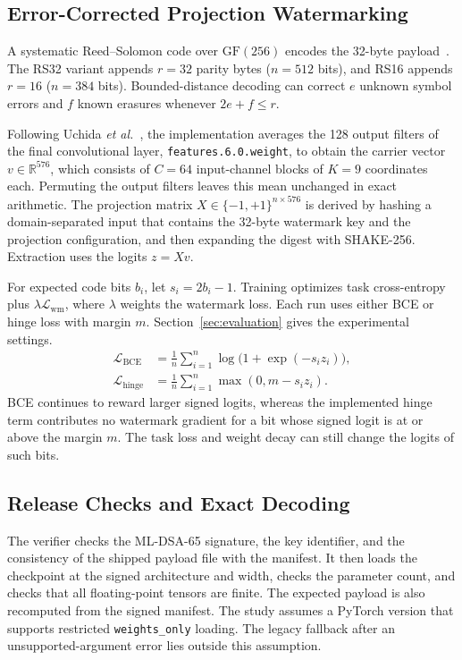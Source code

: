 \subsection{Error-Corrected Projection Watermarking}
A systematic Reed--Solomon code over $\mathrm{GF}(256)$ encodes the 32-byte payload~\cite{reed1960polynomial}. The RS32 variant appends $r=32$ parity bytes ($n=512$ bits), and RS16 appends $r=16$ ($n=384$ bits). Bounded-distance decoding can correct $e$ unknown symbol errors and $f$ known erasures whenever $2e+f\le r$.

Following Uchida \emph{et al.}~\cite{uchida2017embedding}, the implementation averages the 128 output filters of the final convolutional layer, \texttt{features.6.0.weight}, to obtain the carrier vector $v\in\mathbb{R}^{576}$, which consists of $C=64$ input-channel blocks of $K=9$ coordinates each. Permuting the output filters leaves this mean unchanged in exact arithmetic. The projection matrix $X\in\{-1,+1\}^{n\times576}$ is derived by hashing a domain-separated input that contains the 32-byte watermark key and the projection configuration, and then expanding the digest with SHAKE-256. Extraction uses the logits $z=Xv$.

For expected code bits $b_i$, let $s_i=2b_i-1$. Training optimizes task cross-entropy plus $\lambda\mathcal{L}_{\mathrm{wm}}$, where $\lambda$ weights the watermark loss. Each run uses either BCE or hinge loss with margin $m$. Section~\ref{sec:evaluation} gives the experimental settings.
\begin{align}
 \mathcal{L}_{\mathrm{BCE}} &= \frac{1}{n}\sum_{i=1}^{n}
       \log\!\bigl(1+\exp(-s_i z_i)\bigr), \label{eq:bce}\\
 \mathcal{L}_{\mathrm{hinge}} &= \frac{1}{n}\sum_{i=1}^{n}
       \max(0,m-s_i z_i). \label{eq:hinge}
\end{align}
BCE continues to reward larger signed logits, whereas the implemented hinge term contributes no watermark gradient for a bit whose signed logit is at or above the margin $m$. The task loss and weight decay can still change the logits of such bits.

\subsection{Release Checks and Exact Decoding}
The verifier checks the ML-DSA-65 signature, the key identifier, and the consistency of the shipped payload file with the manifest. It then loads the checkpoint at the signed architecture and width, checks the parameter count, and checks that all floating-point tensors are finite. The expected payload is also recomputed from the signed manifest. The study assumes a PyTorch version that supports restricted \texttt{weights\_only} loading. The legacy fallback after an unsupported-argument error lies outside this assumption.

